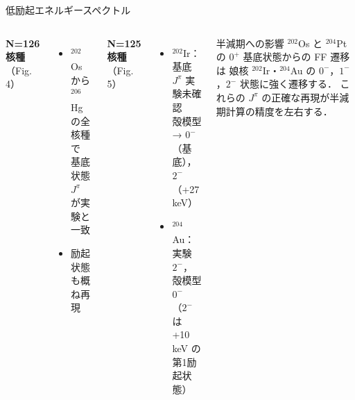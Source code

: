\documentclass[aspectratio=169,12pt]{beamer}
\begin{document}
\begin{frame}{低励起エネルギースペクトル}
  \begin{columns}
    \textbf{N=126 核種}（Fig. 4）
    \begin{itemize}
      \item $^{202}$Os から $^{206}$Hg の全核種で\\
            基底状態 $J^\pi$ が実験と一致
      \item 励起状態も概ね再現
    \end{itemize}
    \vspace{0.5em}
    \textbf{N=125 核種}（Fig. 5）
    \begin{itemize}
      \item $^{202}$Ir：基底 $J^\pi$ 実験未確認\\
            殻模型 → $0^-$（基底），$2^-$（+27 keV）
      \item $^{204}$Au：実験 $2^-$，殻模型 $0^-$\\
            （$2^-$ は +10 keV の第1励起状態）
    \end{itemize}

    \begin{alertblock}{半減期への影響}
      $^{202}$Os と $^{204}$Pt の $0^+$ 基底状態からの FF 遷移は
      娘核 $^{202}$Ir・$^{204}$Au の $0^-$，$1^-$，$2^-$ 状態に強く遷移する．
      これらの $J^\pi$ の正確な再現が半減期計算の精度を左右する．
    \end{alertblock}
  \end{columns}
\end{frame}
\end{document}
